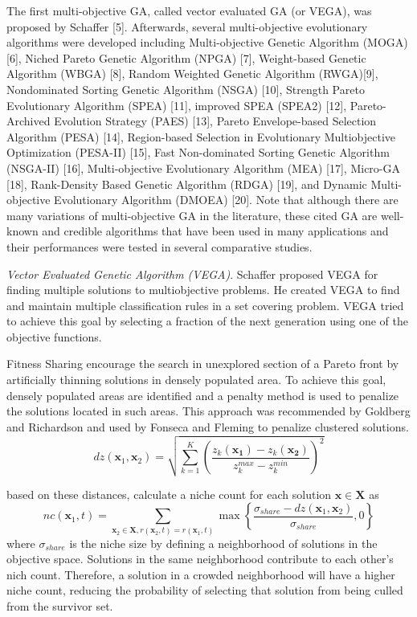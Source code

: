 The first multi-objective GA, called vector evaluated GA (or VEGA), was proposed by Schaffer [5]. Afterwards, several multi-objective evolutionary algorithms were developed including Multi-objective Genetic Algorithm (MOGA) [6], Niched Pareto Genetic Algorithm (NPGA) [7], Weight-based Genetic Algorithm (WBGA) [8], Random Weighted Genetic Algorithm (RWGA)[9], Nondominated Sorting Genetic Algorithm (NSGA) [10], Strength Pareto Evolutionary Algorithm (SPEA) [11], improved SPEA (SPEA2) [12], Pareto-Archived Evolution Strategy (PAES) [13], Pareto Envelope-based Selection Algorithm (PESA) [14], Region-based Selection in Evolutionary Multiobjective Optimization (PESA-II) [15], Fast Non-dominated Sorting Genetic Algorithm (NSGA-II) [16], Multi-objective Evolutionary Algorithm (MEA) [17], Micro-GA [18], Rank-Density Based Genetic Algorithm (RDGA) [19], and Dynamic Multi-objective Evolutionary Algorithm (DMOEA) [20]. Note that although there are many variations of multi-objective GA in the literature, these cited GA are well-known and credible algorithms that have been used in many applications and their performances were tested in several comparative studies.



\emph{Vector Evaluated Genetic Algorithm (VEGA)}.  Schaffer proposed VEGA for finding multiple solutions to multiobjective problems.  He created VEGA to find and maintain multiple classification rules in a set covering problem.  VEGA tried to achieve this goal by selecting a fraction of the next generation using one of the objective functions.

Fitness Sharing encourage the search in unexplored section of a Pareto front by artificially thinning solutions in densely populated area.  To achieve this goal, densely populated areas are identified and a penalty method is used to penalize the solutions located in such areas.  This approach was recommended by Goldberg and Richardson\cite{goldberg1987genetic} and used by Fonseca and Fleming\cite{fonseca1993multiobjective} to penalize clustered solutions.
\begin{equation}
    dz(\bm{x}_1,\bm{x}_2)
    = \sqrt{\sum_{k=1}^{K}  \left(\frac{z_k(\bm{x_1})-z_k(\bm{x_2})}
                                       {z_{k}^{max}-z_{k}^{min}}
                            \right)^{2}
      }
\end{equation}

based on these distances, calculate a niche count for each solution $\bm{x}\in\bm{X}$ as
\begin{equation}
  nc(\bm{x}_1,t)=\sum_{\bm{x}_2\in\bm{X},r(\bm{x}_2,t)=r(\bm{x}_1,t)}
      \max\left\{ \frac{\sigma_{share}-dz(\bm{x}_1,\bm{x}_2)}
                       {\sigma_{share}},0
          \right\}
\end{equation}
where $\sigma_{share}$ is the niche size by defining a neighborhood of solutions in the objective space.  Solutions in the same neighborhood contribute to each other's nich count.  Therefore, a solution in a crowded neighborhood will have a higher niche count, reducing the probability of selecting that solution from being culled from the survivor set.

